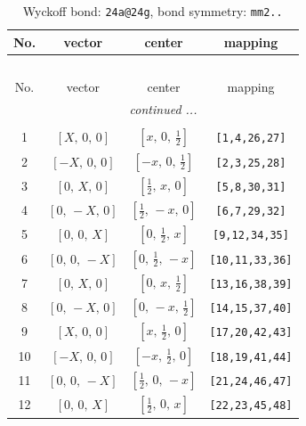 \documentclass[fleqn,8pt]{jsarticle}
\begin{document}
\begin{longtable}{cccc}
\caption{Wyckoff bond: {\tt 24a@24g}, bond symmetry: {\tt mm2..}}
 \\
 \hline \hline
No. & vector & center & mapping \\ \hline \endfirsthead

\multicolumn{3}{l}{\tablename\ \thetable{}} \\
 \hline \hline
No. & vector & center & mapping \\ \hline \endhead

 \hline \hline
\multicolumn{3}{r}{\footnotesize\it continued ...} \\ \endfoot

 \hline \hline
\multicolumn{3}{r}{} \\ \endlastfoot

1 & $\left[ X,\, 0,\, 0 \right]$ & $\left[ x,\, 0,\, \frac{1}{2} \right]$ & {\tt [1,4,26,27]} \\ \hline
2 & $\left[ - X,\, 0,\, 0 \right]$ & $\left[ - x,\, 0,\, \frac{1}{2} \right]$ & {\tt [2,3,25,28]} \\ \hline
3 & $\left[ 0,\, X,\, 0 \right]$ & $\left[ \frac{1}{2},\, x,\, 0 \right]$ & {\tt [5,8,30,31]} \\ \hline
4 & $\left[ 0,\, - X,\, 0 \right]$ & $\left[ \frac{1}{2},\, - x,\, 0 \right]$ & {\tt [6,7,29,32]} \\ \hline
5 & $\left[ 0,\, 0,\, X \right]$ & $\left[ 0,\, \frac{1}{2},\, x \right]$ & {\tt [9,12,34,35]} \\ \hline
6 & $\left[ 0,\, 0,\, - X \right]$ & $\left[ 0,\, \frac{1}{2},\, - x \right]$ & {\tt [10,11,33,36]} \\ \hline
7 & $\left[ 0,\, X,\, 0 \right]$ & $\left[ 0,\, x,\, \frac{1}{2} \right]$ & {\tt [13,16,38,39]} \\ \hline
8 & $\left[ 0,\, - X,\, 0 \right]$ & $\left[ 0,\, - x,\, \frac{1}{2} \right]$ & {\tt [14,15,37,40]} \\ \hline
9 & $\left[ X,\, 0,\, 0 \right]$ & $\left[ x,\, \frac{1}{2},\, 0 \right]$ & {\tt [17,20,42,43]} \\ \hline
10 & $\left[ - X,\, 0,\, 0 \right]$ & $\left[ - x,\, \frac{1}{2},\, 0 \right]$ & {\tt [18,19,41,44]} \\ \hline
11 & $\left[ 0,\, 0,\, - X \right]$ & $\left[ \frac{1}{2},\, 0,\, - x \right]$ & {\tt [21,24,46,47]} \\ \hline
12 & $\left[ 0,\, 0,\, X \right]$ & $\left[ \frac{1}{2},\, 0,\, x \right]$ & {\tt [22,23,45,48]} \\
\end{longtable}
\end{document}
